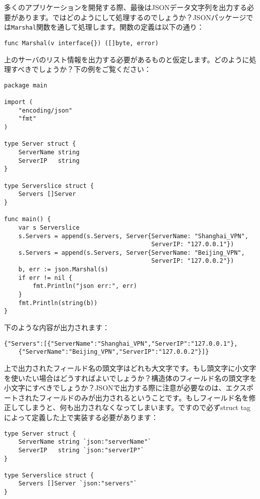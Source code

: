 多くのアプリケーションを開発する際、最後はJSONデータ文字列を出力する必要があります。ではどのようにして処理するのでしょうか？JSONパッケージでは\texttt{Marshal}関数を通して処理します。関数の定義は以下の通り：


\begin{lstlisting}[numbers=none]
func Marshal(v interface{}) ([]byte, error)
\end{lstlisting}

上のサーバのリスト情報を出力する必要があるものと仮定します。どのように処理すべきでしょうか？下の例をご覧ください：

\begin{lstlisting}[numbers=none]
package main

import (
    "encoding/json"
    "fmt"
)

type Server struct {
    ServerName string
    ServerIP   string
}

type Serverslice struct {
    Servers []Server
}

func main() {
    var s Serverslice
    s.Servers = append(s.Servers, Server{ServerName: "Shanghai_VPN",
                                         ServerIP: "127.0.0.1"})
    s.Servers = append(s.Servers, Server{ServerName: "Beijing_VPN",
                                         ServerIP: "127.0.0.2"})
    b, err := json.Marshal(s)
    if err != nil {
        fmt.Println("json err:", err)
    }
    fmt.Println(string(b))
}
\end{lstlisting}

下のような内容が出力されます：

\begin{lstlisting}[numbers=none]
{"Servers":[{"ServerName":"Shanghai_VPN","ServerIP":"127.0.0.1"},
    {"ServerName":"Beijing_VPN","ServerIP":"127.0.0.2"}]}
\end{lstlisting}

上で出力されたフィールド名の頭文字はどれも大文字です。もし頭文字に小文字を使いたい場合はどうすればよいでしょうか？構造体のフィールド名の頭文字を小文字にすべきでしょうか？JSONで出力する際に注意が必要なのは、エクスポートされたフィールドのみが出力されるということです。もしフィールド名を修正してしまうと、何も出力されなくなってしまいます。ですので必ずstruct tagによって定義した上で実装する必要があります：

\begin{lstlisting}[numbers=none]
type Server struct {
    ServerName string `json:"serverName"`
    ServerIP   string `json:"serverIP"`
}

type Serverslice struct {
    Servers []Server `json:"servers"`
}
\end{lstlisting}

